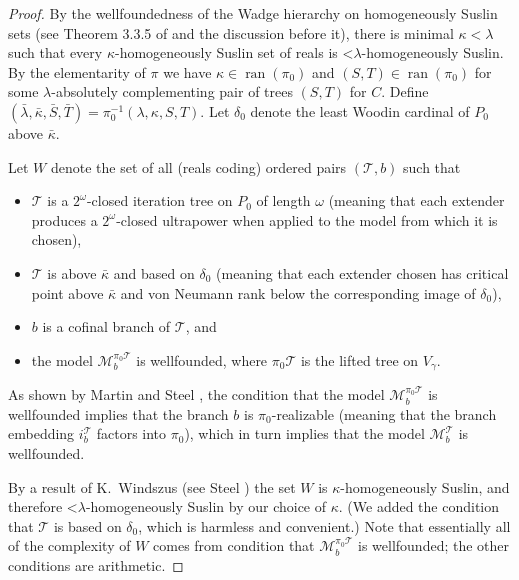 \documentclass[fleqn, 11pt]{amsart}
\theoremstyle{plain}
\theoremstyle{definition}
\theoremstyle{remark}
\newcommand{\less}{\mathord{<}}
\DeclareMathOperator{\ran}{ran}
\begin{document}
\begin{proof}
 By the wellfoundedness of the Wadge hierarchy on homogeneously Suslin sets (see Theorem 3.3.5 of \cite{LarStationaryTower} and the discussion before it), there is minimal $\kappa < \lambda$ such that every $\kappa$-homogeneously Suslin set of reals is $\less\lambda$-homogeneously Suslin.  By the elementarity of $\pi$ we have $\kappa \in \ran(\pi_0)$ and $(S,T) \in \ran(\pi_0)$ for some $\lambda$-absolutely complementing pair of trees $(S,T)$ for $C$.
 Define $(\bar{\lambda},\bar{\kappa},\bar{S},\bar{T}) = \pi_0^{-1}(\lambda,\kappa,S,T)$.
 Let $\delta_0$ denote the least Woodin cardinal of $P_0$ above $\bar{\kappa}$.
 
 Let $W$ denote the set of all (reals coding) ordered pairs $(\mathcal{T},b)$ such that
 \begin{itemize}
  \item $\mathcal{T}$ is a $2^\omega$-closed iteration tree on $P_0$ of length $\omega$ (meaning that each extender produces a $2^{\omega}$-closed ultrapower when applied to the model from which it is chosen),
  \item $\mathcal{T}$ is above $\bar{\kappa}$ and based on $\delta_0$ (meaning that each extender chosen has critical point above $\bar{\kappa}$ and von Neumann rank below the corresponding image of $\delta_{0}$),
  \item $b$ is a cofinal branch of $\mathcal{T}$, and
  \item the model $\mathcal{M}_b^{\pi_0\mathcal{T}}$ is wellfounded, where $\pi_0\mathcal{T}$ is the lifted tree on $V_{\gamma}$.
 \end{itemize}
  
As shown by Martin and Steel \cite[p. 27]{MarSteIterationTrees}, the condition that the model $\mathcal{M}_b^{\pi_0\mathcal{T}}$ is wellfounded implies that the branch $b$ is $\pi_0$-realizable (meaning that the branch embedding $i^\mathcal{T}_b$ factors into $\pi_0$), which in turn implies that the model $\mathcal{M}_b^{\mathcal{T}}$ is wellfounded.
  
  By a  result of K.~Windszus (see Steel \cite[Lemma 1.1]{SteSTFree}) the set $W$ is $\kappa$-homogeneously Suslin, and therefore $\mathord{<}\lambda$-homogeneously Suslin by our choice of $\kappa$. (We added the condition that $\mathcal{T}$ is based on $\delta_0$, which is harmless and convenient.) Note that essentially all of the complexity of $W$ comes from condition that $\mathcal{M}_{b}^{\pi_0\mathcal{T}}$ is wellfounded; the other conditions are arithmetic.
  

\end{proof}
\end{document}
